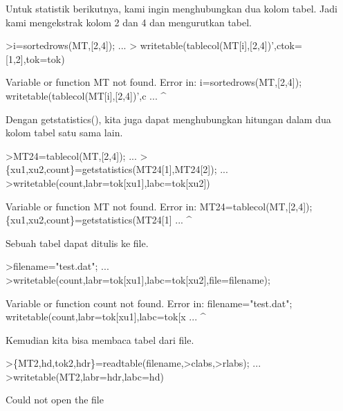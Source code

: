 \documentclass{article}
\begin{document}
\begin{eulernotebook}
\begin{eulercomment}
\begin{eulercomment}
\begin{euleroutput}
\end{euleroutput}
\begin{eulercomment}
Untuk statistik berikutnya, kami ingin menghubungkan dua kolom tabel.
Jadi kami mengekstrak kolom 2 dan 4 dan mengurutkan tabel.
\end{eulercomment}
\begin{eulerprompt}
>i=sortedrows(MT,[2,4]);  ...
>  writetable(tablecol(MT[i],[2,4])',ctok=[1,2],tok=tok)
\end{eulerprompt}
\begin{euleroutput}
  Variable or function MT not found.
  Error in:
  i=sortedrows(MT,[2,4]);    writetable(tablecol(MT[i],[2,4])',c ...
                 ^
\end{euleroutput}
\begin{eulercomment}
Dengan getstatistics(), kita juga dapat menghubungkan hitungan dalam
dua kolom tabel satu sama lain.
\end{eulercomment}
\begin{eulerprompt}
>MT24=tablecol(MT,[2,4]); ...
>\{xu1,xu2,count\}=getstatistics(MT24[1],MT24[2]); ...
>writetable(count,labr=tok[xu1],labc=tok[xu2])
\end{eulerprompt}
\begin{euleroutput}
  Variable or function MT not found.
  Error in:
  MT24=tablecol(MT,[2,4]); \{xu1,xu2,count\}=getstatistics(MT24[1] ...
                  ^
\end{euleroutput}
\begin{eulercomment}
Sebuah tabel dapat ditulis ke file.
\end{eulercomment}
\begin{eulerprompt}
>filename="test.dat"; ...
>writetable(count,labr=tok[xu1],labc=tok[xu2],file=filename);
\end{eulerprompt}
\begin{euleroutput}
  Variable or function count not found.
  Error in:
  filename="test.dat"; writetable(count,labr=tok[xu1],labc=tok[x ...
                                       ^
\end{euleroutput}
\begin{eulercomment}
Kemudian kita bisa membaca tabel dari file.
\end{eulercomment}
\begin{eulerprompt}
>\{MT2,hd,tok2,hdr\}=readtable(filename,>clabs,>rlabs); ...
>writetable(MT2,labr=hdr,labc=hd)
\end{eulerprompt}
\begin{euleroutput}
  Could not open the file

\end{euleroutput}
\end{eulercomment}
\end{eulercomment}
\end{eulernotebook}
\end{document}
